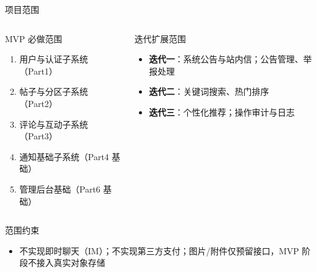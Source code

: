 \documentclass[aspectratio=169,UTF8]{ctexbeamer}
\begin{document}
\begin{frame}{项目范围}
    \begin{columns}
        \begin{block}{MVP 必做范围}
            \begin{enumerate}
                \item 用户与认证子系统（Part1）
                \item 帖子与分区子系统（Part2）
                \item 评论与互动子系统（Part3）
                \item 通知基础子系统（Part4 基础）
                \item 管理后台基础（Part6 基础）
            \end{enumerate}
        \end{block}
        \begin{block}{迭代扩展范围}
            \begin{itemize}
                \item \textbf{迭代一}：系统公告与站内信；公告管理、举报处理
                \item \textbf{迭代二}：关键词搜索、热门排序
                \item \textbf{迭代三}：个性化推荐；操作审计与日志
            \end{itemize}
        \end{block}
    \end{columns}
    \vspace{0.3cm}
    \begin{block}{范围约束}
        \begin{itemize}
            \item 不实现即时聊天（IM）；不实现第三方支付；图片/附件仅预留接口，MVP 阶段不接入真实对象存储
        \end{itemize}
    \end{block}
\end{frame}
\end{document}
